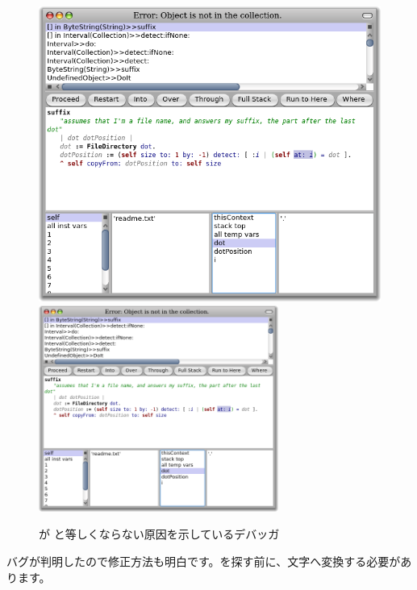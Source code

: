 \documentclass[a4paper,10pt,twoside]{book}
\begin{document}
\begin{figure}[btp]
\begin{center}
\ifluluelse
{\includegraphics[width=\textwidth]{dotIsAString}}
{\includegraphics[width=0.7\textwidth]{dotIsAString}}
\end{center}
\caption{ が  と等しくならない原因を示しているデバッガ}
\end{figure}

バグが判明したので修正方法も明白です。を探す前に、文字へ変換する必要があります。
\end{document}
